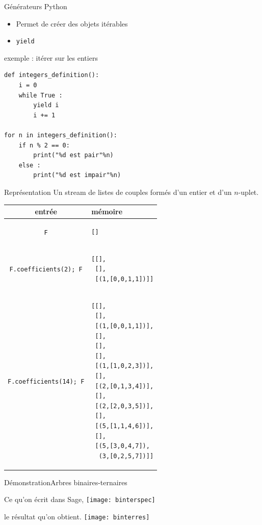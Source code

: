 \documentclass{beamer}
\begin{document}
\begin{frame}[containsverbatim]{Générateurs Python}
\begin{block}{}
\begin{itemize}
\item Permet de créer des objets itérables
\item \texttt{yield}
\end{itemize}
\end{block}
\bigskip
\begin{block}{exemple : itérer sur les entiers}
  \begin{center}
    \begin{lstlisting}
def integers_definition():
    i = 0
    while True :
        yield i
        i += 1

for n in integers_definition():
    if n % 2 == 0:
        print("%d est pair"%n)
    else :
        print("%d est impair"%n)
    \end{lstlisting}
  \end{center}
\end{block}
\end{frame}  

\begin{frame}[containsverbatim]{Représentation}
 \small{Un stream de listes de couples formés d'un entier et d'un $n$-uplet.}
 
\begin{center}
\tiny{ \begin{tabular}{|c|l|}
\hline
entrée  &  mémoire \\
\hline
\texttt{F}
&
\begin{lstlisting}
[]
\end{lstlisting}
 \\
\hline
\texttt{F.coefficients(2); F}
&
\begin{lstlisting}
[[], 
 [],
 [(1,[0,0,1,1])]]
\end{lstlisting} \\
\hline
\texttt{F.coefficients(14); F}
&
\begin{lstlisting}
[[], 
 [],
 [(1,[0,0,1,1])],
 [], 
 [],
 [],
 [(1,[1,0,2,3])],
 [],
 [(2,[0,1,3,4])],
 [],
 [(2,[2,0,3,5])],
 [],
 [(5,[1,1,4,6])],
 [],
 [(5,[3,0,4,7]),
  (3,[0,2,5,7])]]
\end{lstlisting}
\\
\hline
\end{tabular}}
\end{center}
\end{frame}
  
\begin{frame}{Démonstration}{Arbres binaires-ternaires}
\begin{block}{Ce qu'on écrit dans Sage,}
\texttt{[image: binterspec]}
\end{block}
\pause
\bigskip
\begin{block}{le résultat qu'on obtient.}
  \texttt{[image: binterres]}
\end{block}
\end{frame}
\end{document}
